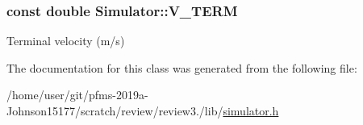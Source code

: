 \subsubsection[{\texorpdfstring{V\+\_\+\+T\+E\+RM}{V_TERM}}]{\setlength{\rightskip}{0pt plus 5cm}const double Simulator\+::\+V\+\_\+\+T\+E\+RM\hspace{0.3cm}{\ttfamily [static]}}\hypertarget{classSimulator_ad903010cfc404794ecfbb2f8903b15ae}{}\label{classSimulator_ad903010cfc404794ecfbb2f8903b15ae}
Terminal velocity (m/s) 

The documentation for this class was generated from the following file\+:\begin{DoxyCompactItemize}
\item 
/home/user/git/pfms-\/2019a-\/\+Johnson15177/scratch/review/review3./lib/\hyperlink{simulator_8h}{simulator.\+h}\end{DoxyCompactItemize}
